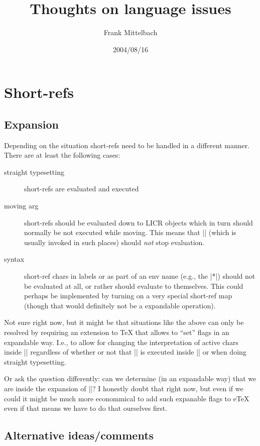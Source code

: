 \documentclass{ltxdoc}
\title{Thoughts on language issues}
\author{Frank Mittelbach}
\date{2004/08/16}
\begin{document}
\maketitle
\tableofcontents

\section{Short-refs}
\subsection{Expansion}

Depending on the situation short-refs need to be handled in a
different manner. There are at least the following cases:
\begin{description}
\item[straight typesetting]
  short-refs are evaluated and executed
\item[moving arg]
  short-refs should be evaluated down to LICR objects which in turn
  should normally be not executed while moving. This means that
  |\protected@edef| (which is usually invoked in such places) should
  \emph{not} stop evaluation.
\item[syntax]
  short-ref chars in labels or as part of an env name (e.g., the |*|)
  should not be evaluated at all, or rather should evaluate to
  themselves. This could perhaps be implemented by turning on a very
  special short-ref map (though that would definitely not be a
  expandable operation).
\end{description}

Not sure right now, but it might be that situations like the above can
only be resolved by requiring an extension to \TeX{} that allows to
``set'' flags in an expandable way. I.e., to allow for changing the
interpretation of active chars inside |\csname| regardless of whether
or not that |\csname| is executed inside |\protected@edef| or when
doing straight typesetting.

Or ask the question differently: can we determine (in an expandable
way) that we are inside the expansion of |\csname|? I honestly doubt
that right now, but even if we could it might be much more econommical
to add such expanable flags to e\TeX{} even if that means we have to
do that ourselves first.


\subsection{Alternative ideas/comments}
\end{document}
